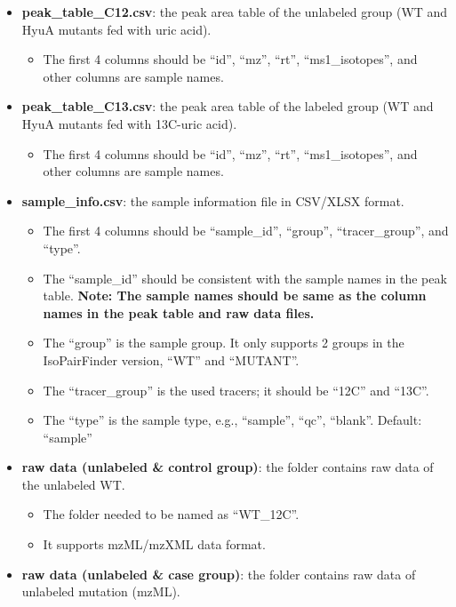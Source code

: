 \documentclass[
  letterpaper,
  DIV=11,
  numbers=noendperiod]{scrreprt}
\providecommand{\tightlist}{%
  \setlength{\itemsep}{0pt}\setlength{\parskip}{0pt}}
\begin{document}
\begin{itemize}
\tightlist
\item
  \textbf{peak\_table\_C12.csv}: the peak area table of the unlabeled
  group (WT and HyuA mutants fed with uric acid).

  \begin{itemize}
  \tightlist
  \item
    The first 4 columns should be ``id'', ``mz'', ``rt'',
    ``ms1\_isotopes'', and other columns are sample names.
  \end{itemize}
\item
  \textbf{peak\_table\_C13.csv}: the peak area table of the labeled
  group (WT and HyuA mutants fed with 13C-uric acid).

  \begin{itemize}
  \tightlist
  \item
    The first 4 columns should be ``id'', ``mz'', ``rt'',
    ``ms1\_isotopes'', and other columns are sample names.
  \end{itemize}
\item
  \textbf{sample\_info.csv}: the sample information file in CSV/XLSX
  format.

  \begin{itemize}
  \tightlist
  \item
    The first 4 columns should be ``sample\_id'', ``group'',
    ``tracer\_group'', and ``type''.
  \item
    The ``sample\_id'' should be consistent with the sample names in the
    peak table. \textbf{Note: The sample names should be same as the
    column names in the peak table and raw data files.}
  \item
    The ``group'' is the sample group. It only supports 2 groups in the
    IsoPairFinder version, ``WT'' and ``MUTANT''.
  \item
    The ``tracer\_group'' is the used tracers; it should be ``12C'' and
    ``13C''.
  \item
    The ``type'' is the sample type, e.g., ``sample'', ``qc'',
    ``blank''. Default: ``sample''
  \end{itemize}
\item
  \textbf{raw data (unlabeled \& control group)}: the folder contains
  raw data of the unlabeled WT.

  \begin{itemize}
  \tightlist
  \item
    The folder needed to be named as ``WT\_12C''.
  \item
    It supports mzML/mzXML data format.
  \end{itemize}
\item
  \textbf{raw data (unlabeled \& case group)}: the folder contains raw
  data of unlabeled mutation (mzML).


\end{itemize}
\end{document}
